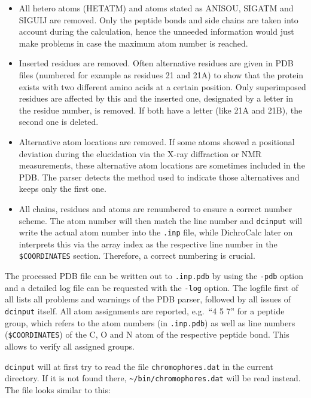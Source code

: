 \documentclass[11pt, letterpaper]{article}
\begin{document}
\begin{itemize}
\item All hetero atoms (HETATM) and atoms stated as ANISOU, SIGATM and SIGUIJ are removed. Only the peptide bonds and side chains are taken into account during the calculation, hence the unneeded information would just make problems in case the maximum atom number is reached.

\item Inserted residues are removed. Often alternative residues are given in PDB files (numbered for example as residues 21 and 21A) to show that the protein exists with two different amino acids at a certain position. Only superimposed residues are affected by this and the inserted one, designated by a letter in the residue number, is removed. If both have a letter (like 21A and 21B), the second one is deleted.

\item Alternative atom locations are removed. If some atoms showed a positional deviation during the elucidation via the X-ray diffraction or NMR measurements, these alternative atom locations are sometimes included in the PDB. The parser detects the method used to indicate those alternatives and keeps only the first one. 

\item All chains, residues and atoms are renumbered to ensure a correct number scheme. The atom number will then match the line number and \verb'dcinput' will write the actual atom number into the \verb'.inp' file, while DichroCalc later on interprets this via the array index as the respective line number in the \verb'$COORDINATES' section. Therefore, a correct numbering is crucial.
\end{itemize}

The processed PDB file can be written out to \verb'.inp.pdb' by using the \verb'-pdb' option and a detailed log file can be requested with the \verb'-log' option. The logfile first of all lists all problems and warnings of the PDB parser, followed by all issues of \verb'dcinput' itself. All atom assignments are reported, e.g.\ ``4 5 7'' for a peptide group, which refers to the atom numbers (in \verb'.inp.pdb') as well as line numbers (\verb'$COORDINATES') of the C, O and N atom of the respective peptide bond. This allows to verify all assigned groups.

\verb'dcinput' will at first try to read the file \verb'chromophores.dat' in the current directory. If it is not found there, \verb'~/bin/chromophores.dat' will be read instead. The file looks similar to this:
\end{document}
